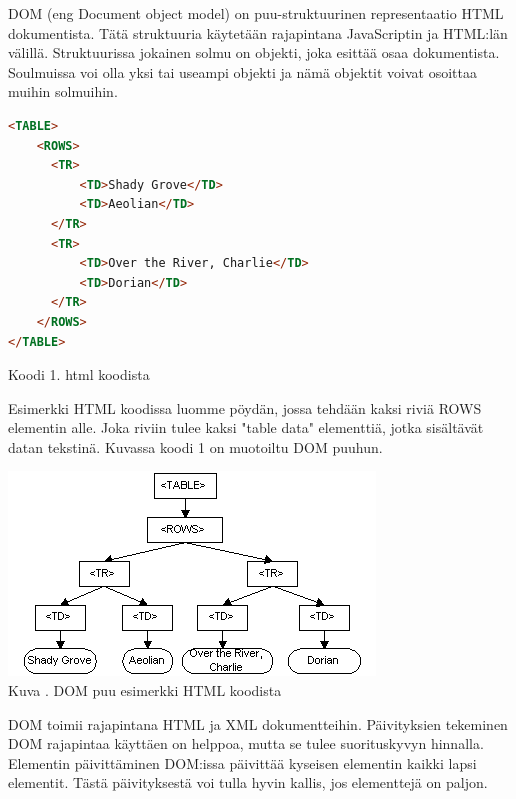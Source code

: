 DOM (eng Document object model) on puu-struktuurinen representaatio HTML dokumentista.
Tätä struktuuria käytetään rajapintana JavaScriptin ja HTML:län välillä. 
Struktuurissa jokainen solmu on objekti, joka esittää osaa dokumentista. 
Soulmuissa voi olla yksi tai useampi objekti ja nämä objektit voivat osoittaa muihin solmuihin.
\bigskip


    
\begin{tcolorbox}
\begin{lstlisting}[language=html]
<TABLE>
    <ROWS> 
      <TR> 
          <TD>Shady Grove</TD>
          <TD>Aeolian</TD> 
      </TR> 
      <TR>
          <TD>Over the River, Charlie</TD>
          <TD>Dorian</TD> 
      </TR> 
    </ROWS>
</TABLE>
\end{lstlisting}
\end{tcolorbox}
Koodi 1. html koodista
\medskip


Esimerkki HTML koodissa luomme pöydän, jossa tehdään kaksi riviä ROWS elementin alle. 
Joka riviin tulee kaksi "table data"{} elementtiä, jotka sisältävät datan tekstinä.
Kuvassa \nextImageCount {} koodi 1 on muotoiltu DOM puuhun.


\bigskip
\includegraphics{./src/public/oppar/dom.png}\\
Kuva \getImgCount {}. DOM puu esimerkki HTML koodista 
\medskip



DOM toimii rajapintana HTML ja XML dokumentteihin.
Päivityksien tekeminen DOM rajapintaa käyttäen on helppoa, mutta se tulee suorituskyvyn hinnalla.
Elementin päivittäminen DOM:issa päivittää kyseisen elementin kaikki lapsi elementit. 
Tästä päivityksestä voi tulla hyvin kallis, jos elementtejä on paljon.
\bigskip



